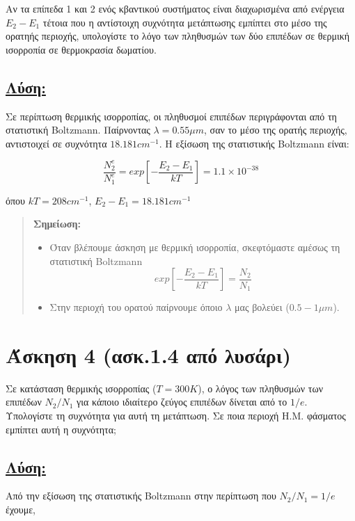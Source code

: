 \documentclass[a4paper,11pt,titlepage]{article}
\begin{document}
Αν τα επίπεδα 1 και 2 ενός κβαντικού συστήματος είναι διαχωρισμένα από ενέργεια $E_2-E_1$ τέτοια που η αντίστοιχη συχνότητα μετάπτωσης εμπίπτει στο μέσο της ορατηής περιοχής, υπολογίστε το λόγο των πληθυσμών των δύο επιπέδων σε θερμική ισορροπία σε θερμοκρασία δωματίου.

\subsection*{\underline{Λύση:}}
Σε περίπτωση θερμικής ισορροπίας, οι πληθυσμοί επιπέδων περιγράφονται από τη στατιστική Boltzmann. Παίρνοντας $\lambda=0.55{\mu}m$, σαν το μέσο της ορατής περιοχής, αντιστοιχεί σε συχνότητα $18.181cm^{-1}$. Η εξίσωση της στατιστικής Boltzmann είναι:

\begin{equation}
\frac{N^e_2}{N^e_1}=exp[-\frac{E_2-E_1}{kT}]=1.1\times10^{-38}
\end{equation}

όπου $kT=208cm^{-1}$, $E_2-E_1=18.181cm^{-1}$

\begin{quote}
 \textbf{Σημείωση:} 
\begin{itemize}
 \item Όταν βλέπουμε άσκηση με θερμική ισορροπία, σκεφτόμαστε αμέσως τη στατιστική Boltzmann
\begin{equation}
exp[-\dfrac{E_2-E_1}{kT}]=\dfrac{N_2}{N_1}
\end{equation}
 \item Στην περιοχή του ορατού παίρνουμε όποιο $\lambda$ μας βολεύει ($0.5-1{\mu}m$).
\end{itemize}
\end{quote}

\newpage
\section{Άσκηση 4 (ασκ.1.4 από λυσάρι)}

Σε κατάσταση θερμικής ισορροπίας ($T=300K$), ο λόγος των πληθυσμών των επιπέδων $N_2/N_1$ για κάποιο ιδιαίτερο ζεύγος επιπέδων δίνεται από το $1/e$. Υπολογίστε τη συχνότητα για αυτή τη μετάπτωση. Σε ποια περιοχή Η.Μ. φάσματος εμπίπτει αυτή η συχνότητα;

\subsection*{\underline{Λύση:}}

Από την εξίσωση της στατιστικής Boltzmann στην περίπτωση που $N_2/N_1=1/e$ έχουμε,
\end{document}
